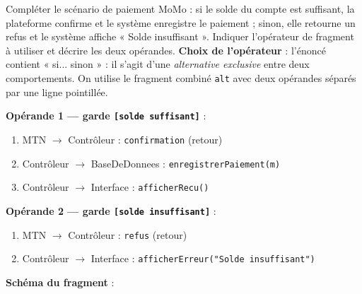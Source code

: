 \documentclass[11pt]{article}
\begin{document}
\begin{exoresolu}
Compléter le scénario de paiement MoMo : si le solde du compte est suffisant, la plateforme confirme et le système enregistre le paiement ; sinon, elle retourne un refus et le système affiche « Solde insuffisant ». Indiquer l'opérateur de fragment à utiliser et décrire les deux opérandes.
\tcblower
\textbf{Choix de l'opérateur} : l'énoncé contient « si... sinon » : il s'agit d'une \emph{alternative exclusive} entre deux comportements. On utilise le fragment combiné \texttt{alt} avec deux opérandes séparés par une ligne pointillée.

\textbf{Opérande 1 — garde \texttt{[solde suffisant]}} :
\begin{enumerate}
\item MTN $\rightarrow$ Contrôleur : \texttt{confirmation} (retour)
\item Contrôleur $\rightarrow$ BaseDeDonnees : \texttt{enregistrerPaiement(m)}
\item Contrôleur $\rightarrow$ Interface : \texttt{afficherRecu()}
\end{enumerate}

\textbf{Opérande 2 — garde \texttt{[solde insuffisant]}} :
\begin{enumerate}
\item MTN $\rightarrow$ Contrôleur : \texttt{refus} (retour)
\item Contrôleur $\rightarrow$ Interface : \texttt{afficherErreur("Solde insuffisant")}
\end{enumerate}

\textbf{Schéma du fragment} :


\end{exoresolu}
\end{document}
